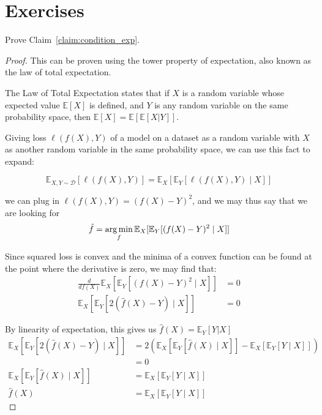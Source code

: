 \section{Exercises}
\begin{exercise}
Prove Claim~\ref{claim:condition_exp}.
\end{exercise}
\begin{proof}

\noindent
  This can be proven using the tower property of expectation, also known as the law of total expectation. 

\begin{fact}
The Law of Total Expectation states that if $X$ is a random variable whose expected value $\mathbb{E}[X]$ is defined, and $Y$ is any random variable on the same probability space, then $\mathbb{E}[X] = \mathbb{E}[\mathbb{E}[X|Y]]$.
\end{fact}

\noindent
Giving loss $\ell(f(X), Y)$ of a model on a dataset as a random variable with $X$ as another random variable in the same probability space, we can use this fact to expand:

$$
\mathbb{E}_{X, Y \sim \mathcal{D}}[\ell(f(X), Y)]=\mathbb{E}_X[\mathbb{E}_Y[\ell(f(X), Y) \mid X]]
$$


 we can plug in $\ell(f(X), Y) = (f(X) - Y)^2$, and we may thus say that we are looking for 
$$\hat{f} = \operatorname*{arg\,min}_f \mathbb{E}_X[\mathbb{E}_Y[(f(X) - Y)^2 \mid X]]$$

\noindent
Since squared loss is convex and the minima of a convex function can be found at the point where the derivative is zero, we may find that:
\begin{align*}
    \frac{d}{df(X)} \mathbb{E}_X[\mathbb{E}_Y[(f(X) - Y)^2 \mid X]] &= 0 \\
    \mathbb{E}_X[\mathbb{E}_Y[2 (\hat{f}(X) - Y) \mid X]] &= 0
\end{align*}

\noindent
By linearity of expectation, this gives us $\hat{f}(X) = \mathbb{E}_Y[Y | X]$
\begin{align*}
    \mathbb{E}_X [\mathbb{E}_Y[2 (\hat{f}(X) - Y) \mid X]] &= 2 (\mathbb{E}_X [\mathbb{E}_Y[\hat{f}(X) \mid X]] - \mathbb{E}_X [\mathbb{E}_Y[Y \mid X]]) \\
    &= 0 \\
    \mathbb{E}_X [\mathbb{E}_Y[\hat{f}(X) \mid X]] &= \mathbb{E}_X [\mathbb{E}_Y[Y \mid X]] \\
    \hat{f}(X) &= \mathbb{E}_X [\mathbb{E}_Y[Y \mid X]]
\end{align*}


\end{proof}
